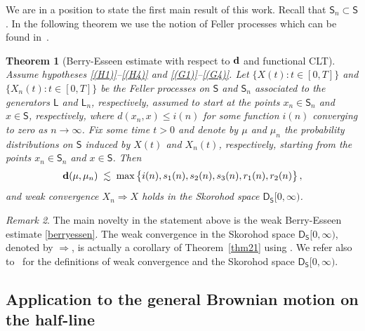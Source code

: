 \documentclass[12pt,a4paper]{article}
\theoremstyle{plain}
\newtheorem{theorem}{Theorem}[section]
\theoremstyle{remark}
\newtheorem{remark}[theorem]{Remark}
\newcommand{\msf}[1]{{\mathsf #1}}
\begin{document}
	We are in a position to state the first main result of this work. Recall that $\msf S_n\subset \msf S$. In the following theorem we use the notion of Feller processes which can be found in~\cite[Chapter 6.2, Definition~6.7]{LeGall}.
	\begin{theorem}[Berry-Esseen estimate with respect to ${\bf d}$ and functional CLT]\label{thm2.3}\quad \\
		Assume hypotheses \ref{(H1)}--\ref{(H4)} and \ref{(G1)}--\ref{(G4)}. Let  $\big\{X(t):t\in [0,T]\big\}$ and $\big\{X_n(t):t\in [0,T]\big\}$ be the Feller  processes on $\msf S$  and $\msf S_n$ associated to the generators $\msf{L}$ and $\msf{L}_n$,  respectively,   assumed to start at the points $x_n \in \msf{S_n}$ and  $x\in \msf{S}$, respectively, where $d(x_n,x)\leq i(n)$ for some function $i(n)$ converging to zero as $n\to\infty$.
		Fix some time  $t>0$ and denote by $\mu$ and $\mu_n$ the probability distributions on $\msf S$ induced by $X(t)$ and $X_n(t)$, respectively, starting from the points $x_n\in \msf{S}_n$ and $x\in \msf{S}$.  Then
		\begin{equation}\label{berryessen}
			{\bf d}(\mu,\mu_n)\;\lesssim \;\max\big\{i(n), s_1(n),s_2(n), s_3(n),r_1(n),r_2(n)\big\}\,,
		\end{equation}
		and weak convergence  $X_n\Rightarrow X$ holds in the Skorohod space $\msf{D}_{\msf S}[0, \infty)$.
	\end{theorem}
	
	
	\begin{remark}\rm
		The main novelty in the statement above is the weak Berry-Esseen estimate \eqref{berryessen}. The weak convergence in the Skorohod space $\msf{D}_{\msf S}[0, \infty)$, denoted by $\Rightarrow$, is actually a corollary of Theorem~\ref{thm21} using \citet[Theorem 2.11, page 172]{EK}. We refer also to~\cite[Chapter 3]{EK} for the definitions of weak convergence and the Skorohod space $\msf{D}_{\msf S}[0, \infty)$.
	\end{remark}
	
	
	\subsection{Application to the  general Brownian motion on the half-line}
	
\end{document}
